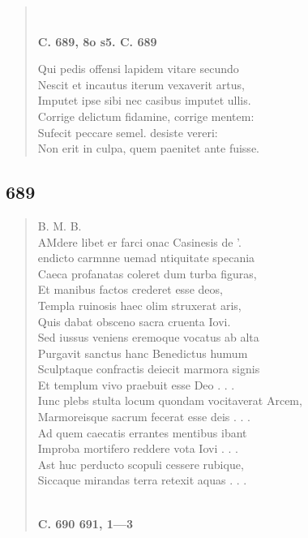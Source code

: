 \documentclass[11pt, a4paper]{report}
\begin{document}
\begin{verse}
        ﻿\pagebreak 
     \marginpar{[166]} \begin{center} \textbf{C. 689, 8o s5. C. 689} \end{center}Qui pedis offensi lapidem vitare secundo \\ Nescit et incautus iterum vexaverit artus, \\ Imputet ipse sibi nec casibus imputet ullis. \\ Corrige delictum fidamine, corrige mentem: \\ Sufecit peccare semel. desiste vereri: \\ Non erit in culpa, quem paenitet ante fuisse. \\ 
      \end{verse}
  
            \subsection*{689}
      \begin{verse}
      B. M. B. \\ AMdere libet er farci onac Casinesis de ’. \\ endicto carmnne uemad ntiquitate specania \\ Caeca profanatas coleret dum turba figuras, \\ Et manibus factos crederet esse deos, \\ Templa ruinosis haec olim struxerat aris, \\ Quis dabat obsceno sacra cruenta Iovi. \\ Sed iussus veniens eremoque vocatus ab alta \\ Purgavit sanctus hanc Benedictus humum \\ Sculptaque confractis deiecit marmora signis \\ Et templum vivo praebuit esse Deo . . . \\ Iunc plebs stulta locum quondam vocitaverat Arcem, \\ Marmoreisque sacrum fecerat esse deis . . . \\ Ad quem caecatis errantes mentibus ibant \\ Improba mortifero reddere vota Iovi . . . \\ Ast huc perducto scopuli cessere rubique, \\ Siccaque mirandas terra retexit aquas . . . \\ 
        ﻿\pagebreak 
    \begin{center} \textbf{C. 690 691, 1—3} \end{center} \marginpar{[167]} 
      \end{verse}
  
\end{document}
